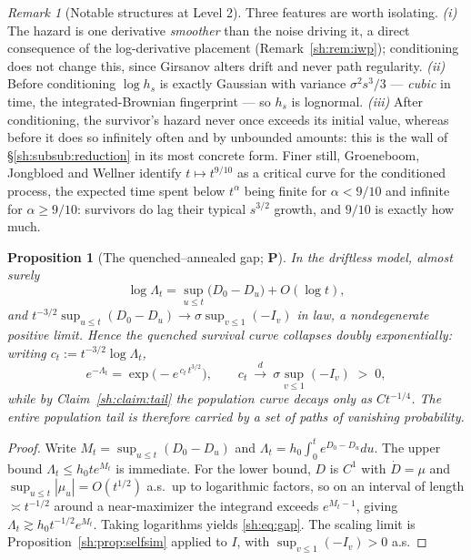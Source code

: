 \documentclass[11pt]{article}
\numberwithin{equation}{section}
\theoremstyle{plain}
\newtheorem{proposition}[theorem]{Proposition}
\theoremstyle{definition}
\theoremstyle{remark}
\newtheorem{remark}[theorem]{Remark}
\begin{document}
\begin{remark}[Notable structures at Level 2]\label{sh:rem:sheet:L2}
Three features are worth isolating. \emph{(i)} The hazard is one
derivative \emph{smoother} than the noise driving it, a direct
consequence of the log-derivative placement
(Remark~\ref{sh:rem:iwp}); conditioning does not change this, since
Girsanov alters drift and never path regularity. \emph{(ii)} Before
conditioning $\log h_s$ is exactly Gaussian with variance
$\sigma^2s^3/3$ --- \emph{cubic} in time, the integrated-Brownian
fingerprint --- so $h_s$ is lognormal. \emph{(iii)} After conditioning,
the survivor's hazard never once exceeds its initial value, whereas
before it does so infinitely often and by unbounded amounts: this is the
wall of \S\ref{sh:subsub:reduction} in its most concrete form. Finer
still, Groeneboom, Jongbloed and Wellner \cite{GJW99} identify
$t\mapsto t^{9/10}$ as a critical curve for the conditioned process, the
expected time spent below $t^\alpha$ being finite for $\alpha<9/10$ and
infinite for $\alpha\ge9/10$: survivors do lag their typical
$s^{3/2}$ growth, and $9/10$ is exactly how much.
\end{remark}

\begin{proposition}[The quenched--annealed gap; \textbf{P}]
\label{sh:prop:gap}
In the driftless model, almost surely
\begin{equation}\label{sh:eq:gap}
\log\Lambda_t=\sup_{u\le t}\bigl(D_0-D_u\bigr)+O(\log t),
\end{equation}
and $t^{-3/2}\sup_{u\le t}(D_0-D_u)\to\sigma\sup_{v\le1}(-I_v)$ in law, a
nondegenerate positive limit. Hence the quenched survival curve
collapses \emph{doubly exponentially}: writing
$c_t:=t^{-3/2}\log\Lambda_t$,
\[
e^{-\Lambda_t}=\exp\bigl(-e^{\,c_t\,t^{3/2}}\bigr),
\qquad
c_t\ \xrightarrow{\;d\;}\ \sigma\sup_{v\le1}(-I_v)\;>\;0,
\]
while by Claim~\ref{sh:claim:tail} the population curve decays only as
$Ct^{-1/4}$. The entire population tail is therefore carried by a set of
paths of vanishing probability.
\end{proposition}

\begin{proof}
Write $M_t=\sup_{u\le t}(D_0-D_u)$ and
$\Lambda_t=h_0\int_0^te^{D_0-D_u}du$. The upper bound
$\Lambda_t\le h_0te^{M_t}$ is immediate. For the lower bound, $D$ is
$C^1$ with $\dot D=\mu$ and $\sup_{u\le t}|\mu_u|=O(t^{1/2})$ a.s.\ up to
logarithmic factors, so on an interval of length $\asymp t^{-1/2}$ around
a near-maximizer the integrand exceeds $e^{M_t-1}$, giving
$\Lambda_t\gtrsim h_0t^{-1/2}e^{M_t}$. Taking logarithms yields
\eqref{sh:eq:gap}. The scaling limit is
Proposition~\ref{sh:prop:selfsim} applied to $I$, with
$\sup_{v\le1}(-I_v)>0$ a.s.
\end{proof}
\end{document}
